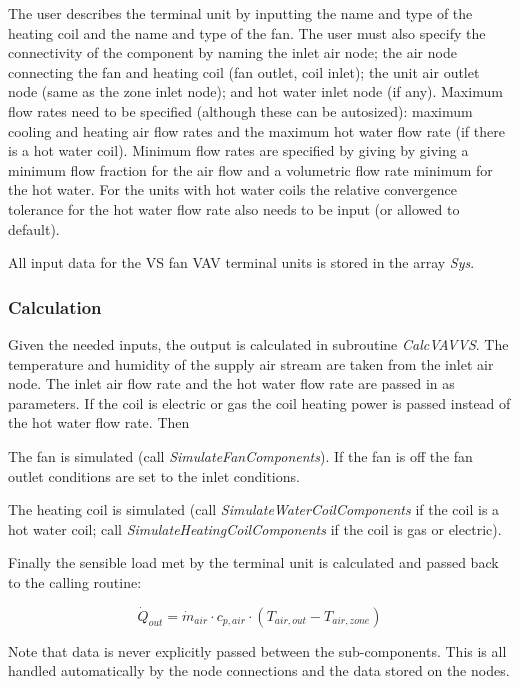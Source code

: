 The user describes the terminal unit by inputting the name and type of the heating coil and the name and type of the fan. The user must also specify the connectivity of the component by naming the inlet air node; the air node connecting the fan and heating coil (fan outlet, coil inlet); the unit air outlet node (same as the zone inlet node); and hot water inlet node (if any). Maximum flow rates need to be specified (although these can be autosized): maximum cooling and heating air flow rates and the maximum hot water flow rate (if there is a hot water coil). Minimum flow rates are specified by giving by giving a minimum flow fraction for the air flow and a volumetric flow rate minimum for the hot water. For the units with hot water coils the relative convergence tolerance for the hot water flow rate also needs to be input (or allowed to default).

All input data for the VS fan VAV terminal units is stored in the array \emph{Sys}.

\subsubsection{Calculation}\label{calculation-2}

Given the needed inputs, the output is calculated in subroutine \emph{CalcVAVVS}. The temperature and humidity of the supply air stream are taken from the inlet air node. The inlet air flow rate and the hot water flow rate are passed in as parameters. If the coil is electric or gas the coil heating power is passed instead of the hot water flow rate. Then

The fan is simulated (call \emph{SimulateFanComponents}). If the fan is off the fan outlet conditions are set to the inlet conditions.

The heating coil is simulated (call \emph{SimulateWaterCoilComponents} if the coil is a hot water coil; call \emph{SimulateHeatingCoilComponents} if the coil is gas or electric).

Finally the sensible load met by the terminal unit is calculated and passed back to the calling routine:

\begin{equation}
{\dot Q_{out}} = {\dot m_{air}}\cdot {c_{p,air}}\cdot ({T_{air,out}} - {T_{air,zone}})
\end{equation}

Note that data is never explicitly passed between the sub-components. This is all handled automatically by the node connections and the data stored on the nodes.

